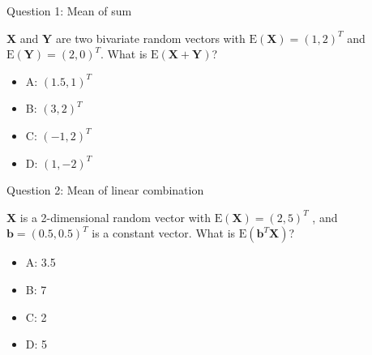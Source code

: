 \documentclass[ignorenonframetext,]{beamer}
\providecommand{\tightlist}{%
  \setlength{\itemsep}{0pt}\setlength{\parskip}{0pt}}
\begin{document}
\begin{frame}

\begin{block}{Question 1: Mean of sum}

\vspace{2mm}

\(\boldsymbol{X}\) and \(\boldsymbol{Y}\) are two bivariate random
vectors with \(\text{E}(\boldsymbol{X})=(1,2)^T\) and
\(\text{E}(\boldsymbol{Y})=(2,0)^T\). What is
\(\text{E}(\boldsymbol{X}+\boldsymbol{Y})\)?

\begin{itemize}
\tightlist
\item
  A: \((1.5,1)^T\)
\item
  B: \((3,2)^T\)
\item
  C: \((-1,2)^ T\)
\item
  D: \((1,-2)^T\)
\end{itemize}

\end{block}

\end{frame}

\begin{frame}

\begin{block}{Question 2: Mean of linear combination}

\vspace{2mm}

\(\boldsymbol{X}\) is a 2-dimensional random vector with
\(\text{E}(\boldsymbol{X})=(2,5)^T\) , and
\(\boldsymbol{b}=(0.5, 0.5)^T\) is a constant vector. What is
\(\text{E}(\boldsymbol{b}^T\boldsymbol{X})\)?

\begin{itemize}
\tightlist
\item
  A: 3.5
\item
  B: 7
\item
  C: 2
\item
  D: 5
\end{itemize}

\end{block}

\end{frame}
\end{document}
